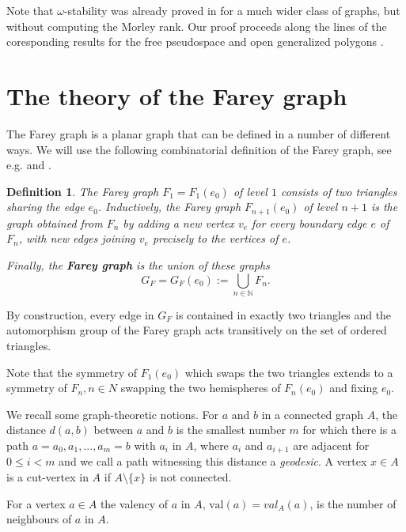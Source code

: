 \documentclass[10pt,a4paper]{amsart}
\newcommand{\val}{\mathrm{val}}
\newtheorem{definition}[defi]{Definition}
\begin{document}
Note that $\omega$-stability was already  proved  in \cite{modeltheorycurvegraph} for a much wider class of graphs, but without computing the Morley rank.
Our proof proceeds along the lines of the coresponding results for the free pseudospace \cite{TENT_2014} and open generalized polygons \cite{AmmerTent2024}.



\section{The theory of the Farey graph}



The Farey graph is a planar graph that can be defined in a number of different ways. We will use the following
combinatorial definition of the Farey graph, see e.g. \cite{office_hours} and \cite{KURKOFKA2021223}.

\begin{definition}
    The Farey graph $F_1=F_1(e_0)$ of level $1$ consists of two triangles sharing the edge $e_0$.
    Inductively, the Farey graph $F_{n+1}(e_0)$ of level $n + 1$ is the graph obtained from $F_n$ by adding a new vertex $v_e$ for every boundary edge $e$ of $F_{n}$,
    with new edges joining $v_e$ precisely to the vertices of $e$.


    Finally, the \textbf{Farey graph} is the union of these  graphs \[G_F =G_F(e_0):= \bigcup_{n \in \mathbb{N}} F_n.\]

\end{definition}

By construction, every edge in $G_F$ is contained in exactly two triangles and the automorphism group of the Farey graph acts transitively on the set of ordered triangles. 


Note that the symmetry of $F_1(e_0)$ which swaps the two triangles extends to  a symmetry of $F_n, n\in N$  swapping the two hemispheres of $F_n(e_0)$ and fixing $e_0$.
    

We  recall some graph-theoretic notions. 
For $a$ and $b$ in a connected graph $A$, the distance $d(a, b)$ between $a$ and $b$ is the smallest number 
$m$ for which there is a path $a = a_0, a_1, ..., a_m = b$ with $a_i$ in $A$, where 
$a_i$ and $a_{i+1}$ are adjacent for $0 \leq i < m$ and we call a path witnessing this distance a \emph{geodesic}. A vertex $x\in A$ is a cut-vertex in $A$ if $A\setminus\{x\}$ is not connected.

For a vertex $a \in A$ the valency of $a$ in $A$,
 $\val(a)=val_A(a)$, is the number of neighbours of $a$ in $A$.
 
\end{document}
